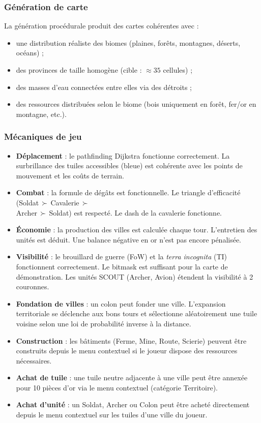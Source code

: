 \documentclass[12pt, a4paper]{article}
\begin{document}
\subsubsection{Génération de carte}

La génération procédurale produit des cartes cohérentes avec :
\begin{itemize}
    \item une distribution réaliste des biomes (plaines, forêts, montagnes, déserts, océans) ;
    \item des provinces de taille homogène (cible : $\approx 35$ cellules) ;
    \item des masses d'eau connectées entre elles via des détroits ;
    \item des ressources distribuées selon le biome (bois uniquement en forêt, fer/or en montagne, etc.).
\end{itemize}

\subsubsection{Mécaniques de jeu}

\begin{itemize}
    \item \textbf{Déplacement} : le pathfinding Dijkstra fonctionne correctement. La surbrillance
    des tuiles accessibles (bleue) est cohérente avec les points de mouvement et les coûts de terrain.
    \item \textbf{Combat} : la formule de dégâts est fonctionnelle. Le triangle d'efficacité
    (Soldat\,$\succ$\,Cavalerie\,$\succ$\,\\Archer\,$\succ$\,Soldat) est respecté. Le dash de la
    cavalerie fonctionne.
    \item \textbf{Économie} : la production des villes est calculée chaque tour. L'entretien
    des unités est déduit. Une balance négative en or n'est pas encore pénalisée.
    \item \textbf{Visibilité} : le brouillard de guerre (FoW) et la \textit{terra incognita} (TI)
    fonctionnent correctement. Le bitmask est suffisant pour la carte de démonstration. Les
    unités SCOUT (Archer, Avion) étendent la visibilité à 2 couronnes.
    \item \textbf{Fondation de villes} : un colon peut fonder une ville. L'expansion territoriale
    se déclenche aux bons tours et sélectionne aléatoirement une tuile voisine selon une loi de
    probabilité inverse à la distance.
    \item \textbf{Construction} : les bâtiments (Ferme, Mine, Route, Scierie) peuvent être
    construits depuis le menu contextuel si le joueur dispose des ressources nécessaires.
    \item \textbf{Achat de tuile} : une tuile neutre adjacente à une ville peut être annexée
    pour 10 pièces d'or via le menu contextuel (catégorie Territoire).
    \item \textbf{Achat d'unité} : un Soldat, Archer ou Colon peut être acheté directement
    depuis le menu contextuel sur les tuiles d'une ville du joueur.
\end{itemize}
\end{document}
